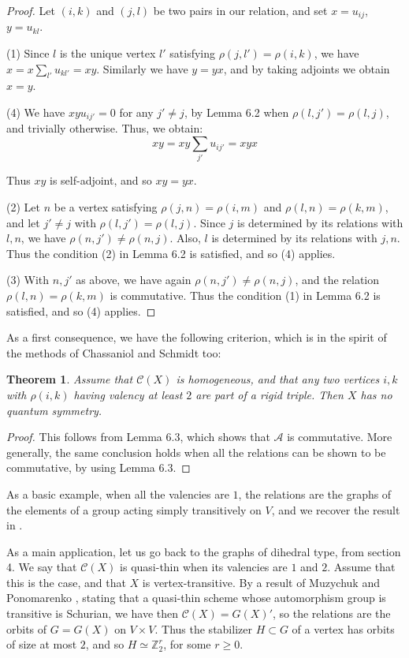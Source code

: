 \documentclass[11pt]{amsart}
\newtheorem{theorem}{Theorem}[section]
\newcommand{\A}{\mathcal A}
\newcommand{\C}{\mathcal C}
\newcommand{\Z}{\mathbb Z}
\begin{document}
\begin{proof}
Let $(i,k)$ and $(j,l)$ be two pairs in our relation, and set $x=u_{ij}$, $y=u_{kl}$.

(1) Since $l$ is the unique vertex $l'$ satisfying $\rho(j,l')=\rho(i,k)$, we have $x=x\sum_{l'}u_{kl'}=xy$. Similarly we have $y=yx$, and by taking adjoints we obtain $x=y$.

(4) We have $xyu_{ij'}=0$ for any $j'\neq j$, by Lemma 6.2 when $\rho(l,j')=\rho(l,j)$, and trivially otherwise. Thus, we obtain:
$$xy=xy\sum_{j'}u_{ij'}=xyx$$

Thus $xy$ is self-adjoint, and so $xy=yx$.

(2) Let $n$ be a vertex satisfying $\rho(j,n)=\rho(i,m)$ and $\rho(l,n)=\rho(k,m)$, and let $j'\neq j$ with $\rho(l,j')=\rho(l,j)$. Since $j$ is determined by its relations with $l,n$, we have $\rho(n,j')\neq\rho(n,j)$. Also, $l$ is determined by its relations with $j,n$. Thus the condition (2) in Lemma 6.2 is satisfied, and so (4) applies.

(3) With $n,j'$ as above, we have again $\rho(n,j')\neq\rho(n,j)$, and the relation $\rho(l,n)=\rho(k,m)$ is commutative. Thus the condition (1) in Lemma 6.2 is satisfied, and so (4) applies.
\end{proof}

As a first consequence, we have the following criterion, which is in the spirit of the methods of Chassaniol \cite{cha} and Schmidt \cite{sc2} too:

\begin{theorem}
Assume that $\C(X)$ is homogeneous, and that any two vertices $i,k$ with $\rho(i,k)$ having valency at least $2$ are part of a rigid triple. Then $X$ has no quantum symmetry.
\end{theorem}

\begin{proof}
This follows from Lemma 6.3, which shows that $\A$ is commutative. More generally, the same conclusion holds when all the relations can be shown to be commutative, by using Lemma 6.3.
\end{proof}

As a basic example, when all the valencies are $1$, the relations are the graphs of the elements of a group acting simply transitively on $V$, and we recover the result in \cite{mn}.

As a main application, let us go back to the graphs of dihedral type, from section 4. We say that $\C(X)$ is quasi-thin when its valencies are $1$ and $2$. Assume that this is the case, and that $X$ is vertex-transitive. By a result of Muzychuk and Ponomarenko \cite{mp2}, stating that a quasi-thin scheme whose automorphism group is transitive is Schurian, we have then $\C(X)=G(X)'$, so the relations are the orbits of $G=G(X)$ on $V\times V$. Thus the stabilizer $H\subset G$ of a vertex has orbits of size at most $2$, and so $H\simeq\Z_2^r$, for some $r\geq0$.
\end{document}
